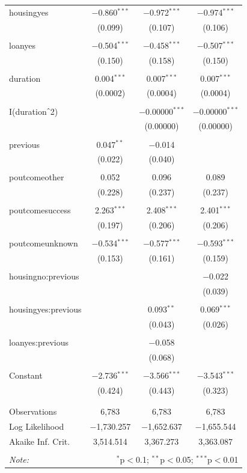 \documentclass[11pt]{article}
\begin{document}
{\begin{longtable}{@{\extracolsep{5pt}}lccc}
 housingyes & $-$0.860$^{***}$ & $-$0.972$^{***}$ & $-$0.974$^{***}$ \\ 
  & (0.099) & (0.107) & (0.106) \\ 
  & & & \\ 
 loanyes & $-$0.504$^{***}$ & $-$0.458$^{***}$ & $-$0.507$^{***}$ \\ 
  & (0.150) & (0.158) & (0.150) \\ 
  & & & \\ 
 duration & 0.004$^{***}$ & 0.007$^{***}$ & 0.007$^{***}$ \\ 
  & (0.0002) & (0.0004) & (0.0004) \\ 
  & & & \\ 
 I(duration$\hat{\mkern6mu}$2) &  & $-$0.00000$^{***}$ & $-$0.00000$^{***}$ \\ 
  &  & (0.00000) & (0.00000) \\ 
  & & & \\ 
 previous & 0.047$^{**}$ & $-$0.014 &  \\ 
  & (0.022) & (0.040) &  \\ 
  & & & \\ 
 poutcomeother & 0.052 & 0.096 & 0.089 \\ 
  & (0.228) & (0.237) & (0.237) \\ 
  & & & \\ 
 poutcomesuccess & 2.263$^{***}$ & 2.408$^{***}$ & 2.401$^{***}$ \\ 
  & (0.197) & (0.206) & (0.206) \\ 
  & & & \\ 
 poutcomeunknown & $-$0.534$^{***}$ & $-$0.577$^{***}$ & $-$0.593$^{***}$ \\ 
  & (0.153) & (0.161) & (0.159) \\ 
  & & & \\ 
 housingno:previous &  &  & $-$0.022 \\ 
  &  &  & (0.039) \\ 
  & & & \\ 
 housingyes:previous &  & 0.093$^{**}$ & 0.069$^{***}$ \\ 
  &  & (0.043) & (0.026) \\ 
  & & & \\ 
 loanyes:previous &  & $-$0.058 &  \\ 
  &  & (0.068) &  \\ 
  & & & \\ 
 Constant & $-$2.736$^{***}$ & $-$3.566$^{***}$ & $-$3.543$^{***}$ \\ 
  & (0.424) & (0.443) & (0.323) \\ 
  & & & \\ 
\hline \\[-1.8ex] 
Observations & 6,783 & 6,783 & 6,783 \\ 
Log Likelihood & $-$1,730.257 & $-$1,652.637 & $-$1,655.544 \\ 
Akaike Inf. Crit. & 3,514.514 & 3,367.273 & 3,363.087 \\ 
\hline 
\hline \\[-1.8ex] 
\textit{Note:}  & \multicolumn{3}{r}{$^{*}$p$<$0.1; $^{**}$p$<$0.05; $^{***}$p$<$0.01} \\ 
\end{longtable} 


}
\end{document}
